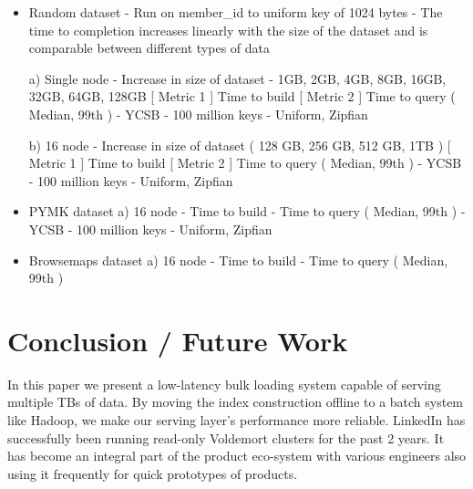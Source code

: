 \documentclass[10pt,twocolumn,preprint,natbib,authoryear]{sigplanconf}
\begin{document}
\begin{itemize}
	\item Random dataset
- Run on member\_id to uniform key of 1024 bytes
- The time to completion increases linearly with the size of the dataset and is comparable between different types of data

a) Single node - Increase in size of dataset - 1GB, 2GB, 4GB, 8GB, 16GB, 32GB, 64GB, 128GB 
       [ Metric 1 ] Time to build
       [ Metric 2 ] Time to query ( Median, 99th ) - YCSB - 100 million keys - Uniform, Zipfian 

b) 16 node - Increase in size of dataset ( 128 GB, 256 GB, 512 GB, 1TB )
      [ Metric 1 ] Time to build
      [ Metric 2 ] Time to query ( Median, 99th ) - YCSB - 100 million keys - Uniform, Zipfian 

	\item PYMK dataset
	a) 16 node 
       - Time to build
       - Time to query ( Median, 99th ) - YCSB - 100 million keys - Uniform, Zipfian 

	\item Browsemaps dataset
	a) 16 node
	   - Time to build
	   - Time to query ( Median, 99th )
\end{itemize}



\section{Conclusion / Future Work}
\label{sec:conclusion}

In this paper we present a low-latency bulk loading system capable of serving multiple TBs of data. By moving the index construction offline to a batch system like Hadoop, we make our serving layer's performance more reliable. LinkedIn has successfully been running read-only Voldemort clusters for the past 2 years. It has become an integral part of the product eco-system with various engineers also using it frequently for quick prototypes of products. 
\end{document}
